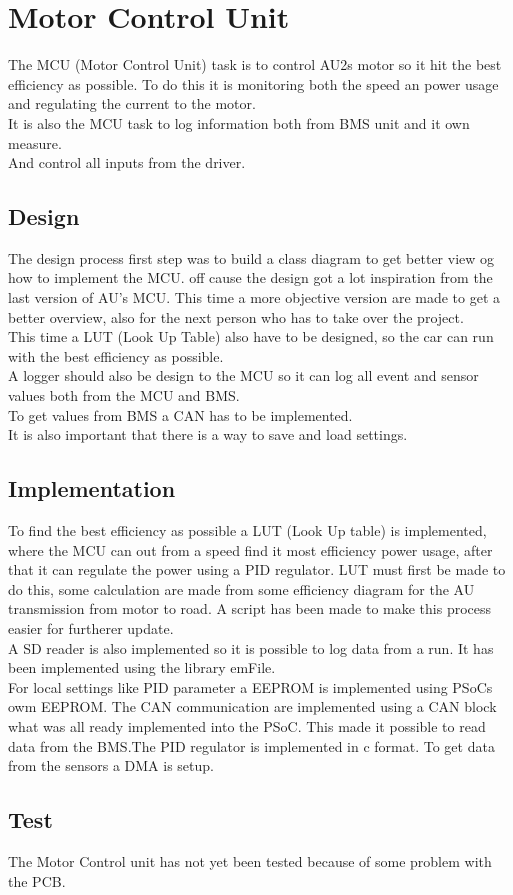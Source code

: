 \section{Motor Control Unit}

The MCU (Motor Control Unit) task is to control AU2s motor so it hit the best efficiency as possible. To do this it is monitoring both the speed an power usage and regulating the current to the motor.\\
It is also the MCU task to log information both from BMS unit and it own measure.\\
And control all inputs from the driver. 
\subsection{Design}

The design process first step was to build a class diagram to get better view og how to implement the MCU.
off cause the design got a lot inspiration from the last version of AU's MCU. This time a more objective version are made to get a better overview, also for the next person who has to take over the project.\\

This time a LUT (Look Up Table) also have to be designed, so the car can run with the best efficiency as possible.\\

A logger should also be design to the MCU so it can log all event and sensor values both from the MCU and BMS.\\ 

To get values from BMS a CAN has to be implemented.\\

It is also important that there is a way to save and load settings. 
\subsection{Implementation}

To find the best efficiency as possible a LUT (Look Up table) is implemented, where the MCU can out from a speed find it most efficiency power usage, after that it can regulate the power using a PID regulator. LUT must first be made to do this, some calculation are made from some efficiency diagram for the AU transmission from motor to road. A script has been made to make this process easier for furtherer update.\\

A SD reader is also implemented so it is possible to log data from a run. It has been implemented using the library emFile.\\ For local settings like PID parameter a EEPROM is implemented using PSoCs owm EEPROM. The CAN communication are implemented using a CAN block what was all ready implemented into the PSoC. This made it possible to read data from the BMS.The PID regulator is implemented in c format. To get data from the sensors a DMA is setup.

\subsection{Test}

The Motor Control unit has not yet been tested because of some problem with the PCB.
